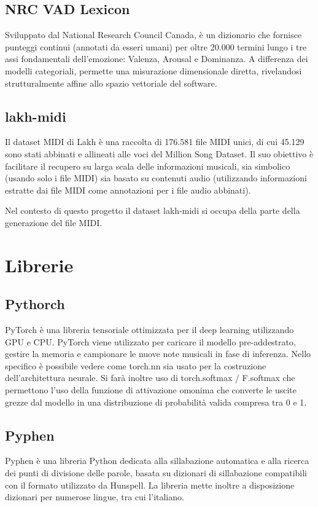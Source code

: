 

 \subsection{NRC VAD Lexicon}
Sviluppato dal National Research Council Canada, è un dizionario che fornisce punteggi continui (annotati da esseri umani) per oltre 20.000 termini lungo 
i tre assi fondamentali dell'emozione: Valenza, Arousal e Dominanza. A differenza dei modelli categoriali, permette una misurazione dimensionale diretta, 
rivelandosi strutturalmente affine allo spazio vettoriale del software.



\subsection{lakh-midi}
Il dataset MIDI di Lakh è una raccolta di 176.581 file MIDI unici, di cui 45.129 sono stati abbinati e allineati alle voci del Million Song Dataset. Il suo obiettivo è facilitare il recupero su larga scala delle informazioni musicali, sia simbolico (usando solo i file MIDI) sia basato su contenuti audio (utilizzando informazioni estratte dai file MIDI come annotazioni per i file audio abbinati).


Nel contesto di questo progetto il dataset lakh-midi si occupa della parte della generazione del file MIDI.
\section{Librerie}
\subsection{Pythorch}
PyTorch è una libreria tensoriale ottimizzata per il deep learning utilizzando GPU e CPU.
PyTorch viene utilizzato per caricare il modello pre-addestrato, gestire la memoria e campionare le nuove note musicali in fase di inferenza.
Nello specifico è possibile vedere come torch.nn sia usato per la costruzione dell'architettura neurale.
Si farà inoltre uso di torch.softmax / F.softmax che permettono l'uso della funzione di attivazione omonima che converte le uscite grezze dal modello in una distribuzione di probabilità valida compresa tra 0 e 1.

\subsection{Pyphen}
Pyphen è una libreria Python dedicata alla sillabazione automatica e alla ricerca dei punti di divisione delle parole, basata su dizionari di 
sillabazione compatibili con il formato utilizzato da Hunspell. La libreria mette inoltre a disposizione dizionari per numerose lingue, tra cui l'italiano.


